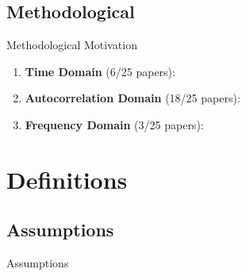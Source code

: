 \documentclass[12pt]{beamer}
\begin{document}
\subsection{Methodological}
\footnotesize
\begin{frame}{Methodological Motivation}
\begin{enumerate}
    \item \textbf{Time Domain} (6/25 papers):\\
    \begin{scriptsize}
        \cite{kaneoke_variance_2012, meisel_decline_2017, huang_timescales_2018, lurie_cortical_2024, shinn_functional_2023, shafiei_topographic_2020}
    \end{scriptsize}
    \item \textbf{Autocorrelation Domain} (18/25 papers):\\
    \begin{scriptsize}
        \cite{murray_hierarchy_2014, rossi-pool_invariant_2021, cirillo_neural_2018, ito_cortical_2020, runyan_distinct_2017, zeraati_flexible_2022, nougaret_intrinsic_2021, wasmuht_intrinsic_2018, muller_core_2020, maisson_choice-relevant_2021, li_hierarchical_2022, shafiei_topographic_2020, wengler_distinct_2020, manea_intrinsic_2022, watanabe_atypical_2019, zilio_are_2021, raut_hierarchical_2020, golesorkhi_temporal_2021}
    \end{scriptsize}
    \item \textbf{Frequency Domain} (3/25 papers):\\
    \begin{scriptsize}
        \cite{gao_neuronal_2020, zeraati_flexible_2022, fallon_timescales_2020}
    \end{scriptsize}
\end{enumerate}
\end{frame}

\section{Definitions}

\subsection{Assumptions}
\begin{frame}{Assumptions}
\end{frame}

\end{document}
